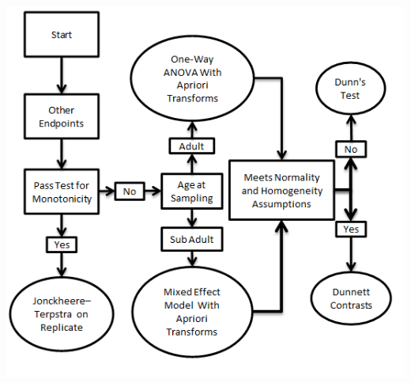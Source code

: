 \documentclass[a4paper]{article}
\begin{document}
	\begin{center}
	\includegraphics[width=\textwidth,keepaspectratio]{FlowChart.png}
	\end{center} 
\end{document}
